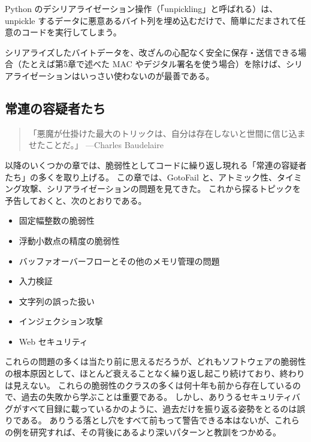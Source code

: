 \documentclass[uplatex]{jsarticle}
\def\label#1{}%
\begin{document}
\begin{exa}\label{exa:ch8-unpickling}
Python のデシリアライゼーション操作（「unpickling」と呼ばれる）は、unpickle するデータに悪意あるバイト列を埋め込むだけで、簡単にだまされて任意のコードを実行してしまう。
\end{exa}

シリアライズしたバイトデータを、改ざんの心配なく安全に保存・送信できる場合（たとえば第5章で述べた MAC やデジタル署名を使う場合）を除けば、シリアライゼーションはいっさい使わないのが最善である。

\subsection{常連の容疑者たち}

\begin{quote}
「悪魔が仕掛けた最大のトリックは、自分は存在しないと世間に信じ込ませたことだ。」 ---Charles Baudelaire
\end{quote}

以降のいくつかの章では、脆弱性としてコードに繰り返し現れる「常連の容疑者たち」の多くを取り上げる。
この章では、GotoFail と、アトミック性、タイミング攻撃、シリアライゼーションの問題を見てきた。
これから探るトピックを予告しておくと、次のとおりである。
\begin{itemize}
\item 固定幅整数の脆弱性
\item 浮動小数点の精度の脆弱性
\item バッファオーバーフローとその他のメモリ管理の問題
\item 入力検証
\item 文字列の誤った扱い
\item インジェクション攻撃
\item Web セキュリティ
\end{itemize}

これらの問題の多くは当たり前に思えるだろうが、どれもソフトウェアの脆弱性の根本原因として、ほとんど衰えることなく繰り返し起こり続けており、終わりは見えない。
これらの脆弱性のクラスの多くは何十年も前から存在しているので、過去の失敗から学ぶことは重要である。
しかし、ありうるセキュリティバグがすべて目録に載っているかのように、過去だけを振り返る姿勢をとるのは誤りである。
ありうる落とし穴をすべて前もって警告できる本はないが、これらの例を研究すれば、その背後にあるより深いパターンと教訓をつかめる。

\newpage
\end{document}
